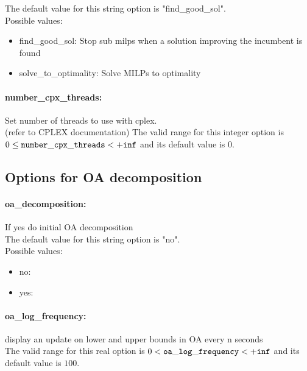 The default value for this string option is "find\_good\_sol".
\\ 
Possible values:
\begin{itemize}
   \item find\_good\_sol: Stop sub milps when a solution improving the
incumbent is found
   \item solve\_to\_optimality: Solve MILPs to optimality
\end{itemize}

\paragraph{\bf number\_cpx\_threads:}\label{sec:number_cpx_threads} Set number of threads to use with cplex. $\;$ \\
 (refer to CPLEX documentation) The valid range for this integer option is
$0 \le {\tt number\_cpx\_threads } <  {\tt +inf}$
and its default value is $0$.


\subsection{Options for OA decomposition}
\label{sec:Options_for_OA_decomposition}
\paragraph{\bf oa\_decomposition:}\label{sec:oa_decomposition} If yes do initial OA decomposition $\;$ \\

The default value for this string option is "no".
\\ 
Possible values:
\begin{itemize}
   \item no: 
   \item yes: 
\end{itemize}

\paragraph{\bf oa\_log\_frequency:}\label{sec:oa_log_frequency} display an update on lower and upper bounds in OA every n seconds $\;$ \\
 The valid range for this real option is 
$0 <  {\tt oa\_log\_frequency } <  {\tt +inf}$
and its default value is $100$.


